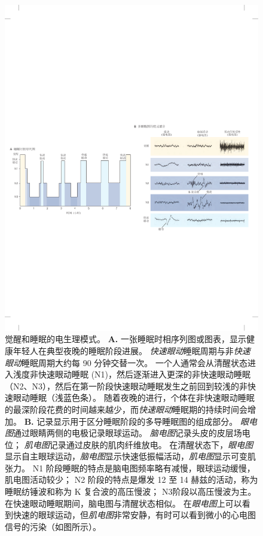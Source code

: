 \begin{figure}[htbp]
	\centering
	\includegraphics[width=1.0\linewidth]{chap44/fig_44_1}
	\caption{觉醒和睡眠的电生理模式。
		\textbf{A.} 一张睡眠时相序列图或图表，显示健康年轻人在典型夜晚的睡眠阶段进展。
		\textit{快速眼动}睡眠周期与非\textit{快速眼动}睡眠周期大约每 90 分钟交替一次。
		一个人通常会从清醒状态进入浅度非快速眼动睡眠 (N1)，然后逐渐进入更深的非快速眼动睡眠（N2、N3），然后在第一阶段快速眼动睡眠发生之前回到较浅的非快速眼动睡眠（浅蓝色条）。
		随着夜晚的进行，个体在非快速眼动睡眠的最深阶段花费的时间越来越少，而\textit{快速眼动}睡眠期的持续时间会增加。
		\textbf{B.} 记录显示用于区分睡眠阶段的多导睡眠图的组成部分。
		\textit{眼电图}通过眼睛两侧的电极记录眼球运动。
		\textit{脑电图}记录头皮的皮层场电位； \textit{肌电图}记录通过皮肤的肌肉纤维放电。
		在清醒状态下，\textit{眼电图}显示自主眼球运动，\textit{脑电图}显示快速低振幅活动，\textit{肌电图}显示可变肌张力。
		N1 阶段睡眠的特点是脑电图频率略有减慢，眼球运动缓慢，肌电图活动较少；
		N2 阶段的特点是爆发 12 至 14 赫兹的活动，称为睡眠纺锤波和称为 K 复合波的高压慢波；
		N3阶段以高压慢波为主。
		在快速眼动睡眠期间，脑电图与清醒状态相似。
		在\textit{眼电图}上可以看到快速的眼球运动，但\textit{肌电图}非常安静，有时可以看到微小的心电图信号的污染（如图所示）。}
	\label{fig:44_1}
\end{figure}



